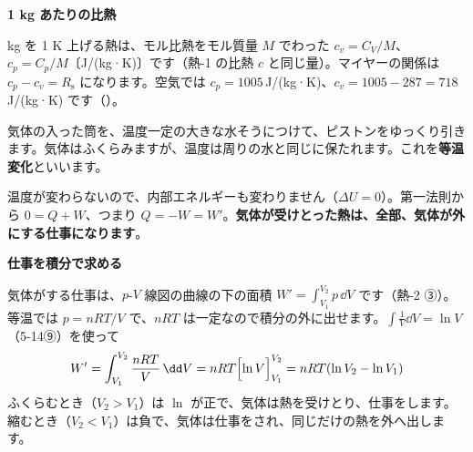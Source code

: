 \noindent\textbf{1 kg あたりの比熱}\par{} kg を 1 K 上げる熱は、モル比熱をモル質量 $M$ でわった $c_v=C_V/M$、$c_p=C_p/M$〔J/(kg·K)〕です（熱-1 の比熱 $c$ と同じ量）。マイヤーの関係は $c_p-c_v=R_{\mathrm s}$ になります。空気では $c_p=1005$\,J/(kg·K)、$c_v=1005-287=718$\,J/(kg·K) です（）。

\begin{phflow}
\end{phflow}


\leavevmode\label{ph:熱-3:sec5}気体の入った筒を、温度一定の大きな水そうにつけて、ピストンをゆっくり引きます。気体はふくらみますが、温度は周りの水と同じに保たれます。これを\textbf{等温変化}といいます。

温度が変わらないので、内部エネルギーも変わりません（$\Delta U=0$）。第一法則から $0=Q+W$、つまり $Q=-W=W'$。\textbf{気体が受けとった熱は、全部、気体が外にする仕事になります}。

\noindent\textbf{仕事を積分で求める}\par\nobreak
気体がする仕事は、$p$-$V$ 線図の曲線の下の面積 $W'=\int_{V_1}^{V_2}p\,\dd V$ です（熱-2 ③）。等温では $p=nRT/V$ で、$nRT$ は一定なので積分の外に出せます。$\int\frac{1}{V}\dd V=\ln V$（5-14⑨）を使って
\[ W'=\int_{V_1}^{V_2}\frac{nRT}{V}\,\dd V=nRT\Bigl[\ln V\Bigr]_{V_1}^{V_2}=nRT(\ln V_2-\ln V_1) \]
\label{ph:熱-3:toon}ふくらむとき（$V_2>V_1$）は $\ln$ が正で、気体は熱を受けとり、仕事をします。縮むとき（$V_2<V_1$）は負で、気体は仕事をされ、同じだけの熱を外へ出します。


